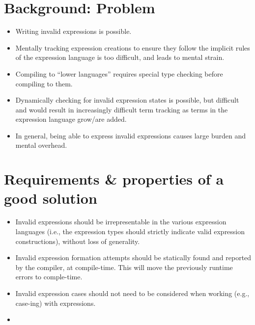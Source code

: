 \section{Background: Problem}

\begin{itemize}
    
    \item Writing invalid expressions is possible.
    
    \item Mentally tracking expression creations to ensure they follow
          the implicit rules of the expression language is too difficult,
          and leads to mental strain.

    \item Compiling to ``lower languages'' requires special type checking
          before compiling to them. 
    
    \item Dynamically checking for invalid expression states is possible,
          but difficult and would result in increasingly difficult term
          tracking as terms in the expression language grow/are added.

    \item In general, being able to express invalid expressions causes
          large burden and mental overhead.
    
\end{itemize}


\section{Requirements \& properties of a good solution}

\begin{itemize}
    
    \item Invalid expressions should be irrepresentable in the various 
          expression languages (i.e., the expression types should strictly
          indicate valid expression constructions), without loss of generality.
    
    \item Invalid expression formation attempts should be statically found
          and reported by the compiler, at compile-time. This will move the 
          previously runtime errors to comple-time.

    \item Invalid expression cases should not need to be considered when
          working (e.g., case-ing) with expressions.

    \item {}

\end{itemize}

